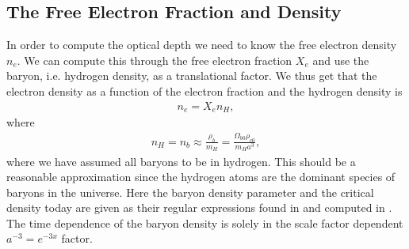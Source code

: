 \documentclass[twocolumn]{aastex62}
\begin{document}
\subsection{The Free Electron Fraction and Density}
In order to compute the optical depth we need to know the free electron density $n_e$. We can compute this through the free electron fraction $X_e$ and use the baryon, i.e. hydrogen density, as a translational factor. We thus get that the electron density as a function of the electron fraction and the hydrogen density is 
\begin{align}
    n_e = X_e n_H,
\end{align}
where 
\begin{align}
    n_H = n_b \approx \frac{\rho_b}{m_H} = \frac{\Omega_{b0} \rho_{c0}}{m_H a^3},
\end{align}
where we have assumed all baryons to be in hydrogen. This should be a reasonable approximation since the hydrogen atoms are the dominant species of baryons in the universe. Here the baryon density parameter and the critical density today are given as their regular expressions found in and computed in \cite{stutzer:2020}. The time dependence of the baryon density is solely in the scale factor dependent $a^{-3} = e^{-3x}$ factor. 
\end{document}

